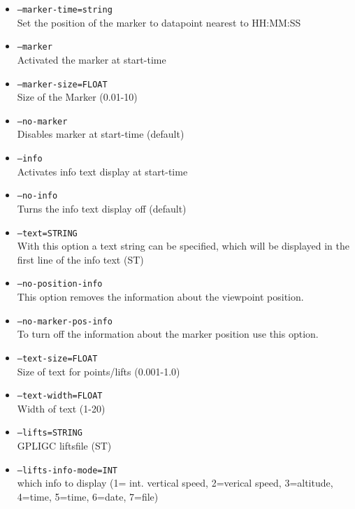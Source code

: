 \begin{itemize}
\item \texttt{--marker-time=string } \\
Set the position of the marker to datapoint nearest to HH:MM:SS

\item \texttt{--marker } \\
Activated the marker at start-time

\item \texttt{--marker-size=FLOAT}\\
Size of the Marker (0.01-10)

\item \texttt{--no-marker} \\
Disables marker at start-time (default)

\item \texttt{--info} \\
Activates info text display at start-time

\item \texttt{--no-info} \\
Turns the info text display off (default)

\item \texttt{--text=STRING} \\
With this option a text string can be specified, which will be displayed
in the first line of the info text (ST)

\item \texttt{--no-position-info}\\
This option removes the information about the viewpoint position.

\item \texttt{--no-marker-pos-info}\\
To turn off the information about the marker position use this option.

\item \texttt{--text-size=FLOAT}\\
Size of text for points/lifts (0.001-1.0)

\item \texttt{--text-width=FLOAT}\\Width of text (1-20)

\item \texttt{--lifts=STRING}\\GPLIGC liftsfile (ST)

\item \texttt{--lifts-info-mode=INT}\\which info to display (1= int. vertical speed, 2=verical speed, 3=altitude, 4=time, 5=time, 6=date, 7=file)



\end{itemize}
